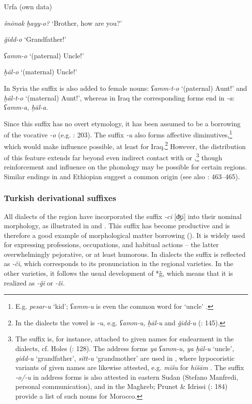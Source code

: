 \documentclass[output=paper]{langsci/langscibook}
\begin{document}
\ea
Urfa (own data)

\textit{šnōnak} \textit{ḫayy-o?} ‘Brother, how are you?’

\textit{ǧidd-o} ‘Grandfather!’

\textit{ʕamm-o} ‘(paternal) Uncle!’

\textit{ḫāl-o} ‘(maternal) Uncle!’
\z

In Syria the suffix is also added to female nouns: \textit{ʕamm-t-o} ‘(paternal) Aunt!’ and \textit{ḫāl-t-o} ‘(maternal) Aunt!’, whereas in Iraq the corresponding forms end in \textit{{}-a}: \textit{ʕamm-a,} \textit{ḫāl-a}.

Since this suffix has no overt  etymology, it has been assumed to be a borrowing of the  {vocative} \textit{-o} (e.g. \citealt{Grigore2007book}: 203). The  suffix \textit{-u} also forms affective diminutives,\footnote{E.g. \textit{pesar-u} ‘kid’; \textit{ʕamm-u} is even the common word for ‘uncle’ \citep[1011]{Perry2007}.} which would make  influence possible, at least for Iraq.\footnote{In the  dialects the vowel is \textit{-u}, e.g. \textit{ʕamm-u,} \textit{ḫāl-u} and \textit{ǧidd-u} (\citealt{Abu-Haidar1999}: 145).} However, the distribution of this feature extends far beyond even indirect contact with  or ,\footnote{The suffix is, for instance, attached to given names for endearment in the  dialects, cf. Holes (\citeyear{Holes2016}: 128). The address forms \textit{ya} \textit{ʕamm-u,} \textit{ya} \textit{ḫāl-u} ‘uncle’, \textit{gidd-u} ‘grandfather’, \textit{sitt-u} ‘grandmother’ are used in , where hypocoristic variants of given names are likewise attested, e.g. \textit{mīšu} for \textit{hišām} \citep[109]{Woidich2006}. The suffix \textit{-o/-u} in address forms is also attested in eastern Sudan (Stefano Manfredi, personal communication), and in the Maghreb; Prunet \& Idrissi (\citeyear{PrunetIdrissi2014}: 184) provide a list of such nouns for Morocco.} though reinforcement and influence on the phonology may be possible for certain regions. Similar endings in  \citep[88--89]{Fassberg2010} and Ethiopian \citep[122]{Brockelmann1928} suggest a common  origin (see also \citealt{Pat-El2017}: 463--465). 

\subsubsection{Turkish derivational suffixes}
All dialects of the region have incorporated the  suffix \textit{-ci} [ʤi] into their nominal morphology, as illustrated in  and . This suffix has become productive and is therefore a good example of morphological {matter borrowing} (\citealt{GardaniArkadievAmiridze2015}). It is widely used for expressing professions, occupations, and habitual actions – the latter overwhelmingly pejorative, or at least humorous. In  dialects the suffix is reflected as \textit{-či}, which corresponds to its pronunciation in the regional  varieties. In the other varieties, it follows the usual development of *ǧ, which means that it is realized as \textit{-ǧi} or \textit{-ži.} 
\end{document}
